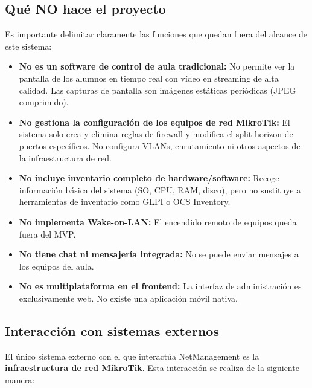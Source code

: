 \documentclass[12pt, a4paper, twoside]{article}
\begin{document}
\subsection{Qué NO hace el proyecto}

Es importante delimitar claramente las funciones que quedan fuera del alcance de este sistema:

\begin{itemize}
  \item \textbf{No es un software de control de aula tradicional:} No permite ver la pantalla de los alumnos en tiempo real con vídeo en streaming de alta calidad. Las capturas de pantalla son imágenes estáticas periódicas (JPEG comprimido).
  \item \textbf{No gestiona la configuración de los equipos de red MikroTik:} El sistema solo crea y elimina reglas de firewall y modifica el split-horizon de puertos específicos. No configura VLANs, enrutamiento ni otros aspectos de la infraestructura de red.
  \item \textbf{No incluye inventario completo de hardware/software:} Recoge información básica del sistema (SO, CPU, RAM, disco), pero no sustituye a herramientas de inventario como GLPI o OCS Inventory.
  \item \textbf{No implementa Wake-on-LAN:} El encendido remoto de equipos queda fuera del MVP.
  \item \textbf{No tiene chat ni mensajería integrada:} No se puede enviar mensajes a los equipos del aula.
  \item \textbf{No es multiplataforma en el frontend:} La interfaz de administración es exclusivamente web. No existe una aplicación móvil nativa.
\end{itemize}

\subsection{Interacción con sistemas externos}

El único sistema externo con el que interactúa NetManagement es la \textbf{infraestructura de red MikroTik}. Esta interacción se realiza de la siguiente manera:
\end{document}
